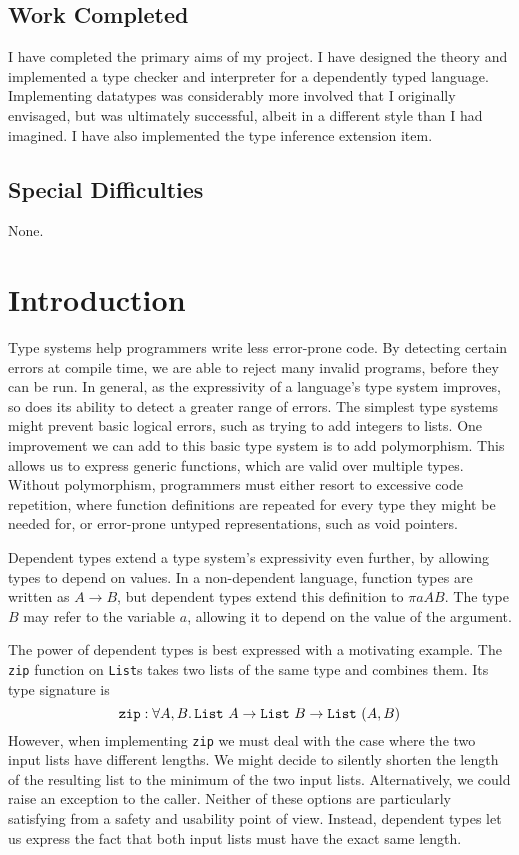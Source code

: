 \documentclass[12pt,a4paper,twoside]{report}
\begin{document}
\section*{Work Completed}

I have completed the primary aims of my project.
I have designed the theory and implemented a type checker and interpreter for a dependently typed language.
Implementing datatypes was considerably more involved that I originally envisaged, but was ultimately successful, albeit in a different style than I had imagined.
I have also implemented the type inference extension item.

\section*{Special Difficulties}

None.

\tableofcontents

\chapter{Introduction}
\pagestyle{headings}

Type systems help programmers write less error-prone code.
By detecting certain errors at compile time, we are able to reject many invalid programs, before they can be run.
In general, as the expressivity of a language's type system improves, so does its ability to detect a greater range of errors.
The simplest type systems might prevent basic logical errors, such as trying to add integers to lists.
One improvement we can add to this basic type system is to add polymorphism.
This allows us to express generic functions, which are valid over multiple types.
Without polymorphism, programmers must either resort to excessive code repetition, where function definitions are repeated for every type they might be needed for, or error-prone untyped representations, such as void pointers.

Dependent types extend a type system's expressivity even further, by allowing types to depend on values.
In a non-dependent language, function types are written as \(A \rightarrow B\), but dependent types extend this definition to \(\pi{a}{A}{B}\).
The type \(B\) may refer to the variable \(a\), allowing it to depend on the value of the argument.

The power of dependent types is best expressed with a motivating example.
The \texttt{zip} function on \texttt{List}s takes two lists of the same type and combines them.
Its type signature is
\[
    \texttt{zip} : \forall A, B \ldotp \texttt{List}\ A \rightarrow \texttt{List}\ B \rightarrow \texttt{List}\ (A, B)
\]
However, when implementing \texttt{zip} we must deal with the case where the two input lists have different lengths.
We might decide to silently shorten the length of the resulting list to the minimum of the two input lists.
Alternatively, we could raise an exception to the caller.
Neither of these options are particularly satisfying from a safety and usability point of view.
Instead, dependent types let us express the fact that both input lists must have the exact same length.
\end{document}
